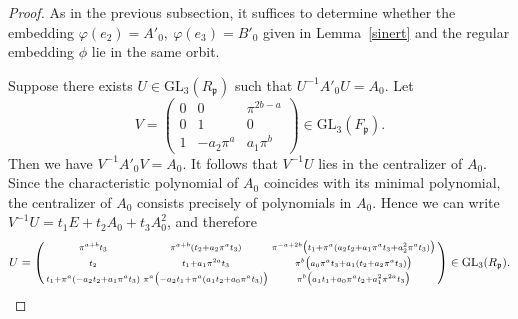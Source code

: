 \documentclass[12pt]{article}
\theoremstyle{plain}
\theoremstyle{definition}
\theoremstyle{remark}
\begin{document}
\begin{proof}
As in the previous subsection, it suffices to determine whether the embedding $\varphi(e_2)=A'_0,\ \varphi(e_3)=B'_0$ given in Lemma~\ref{sinert} and the regular embedding $\phi$ lie in the same orbit.

Suppose there exists $U\in \mathrm{GL}_3(R_\mathfrak{p})$ such that $U^{-1}A'_0 U = A_0$. Let 
$$V=\begin{pmatrix}
0 & 0 & \pi^{2b-a} \\
0 & 1 & 0 \\
1 & -a_2\pi^a & a_1\pi^b
\end{pmatrix}\in \mathrm{GL}_3(F_\mathfrak{p}).$$
Then we have $V^{-1}A'_0 V = A_0$. It follows that $V^{-1}U$ lies in the centralizer of $A_0$. Since the characteristic polynomial of $A_0$ coincides with its minimal polynomial, the centralizer of $A_0$ consists precisely of polynomials in $A_0$. Hence we can write $V^{-1}U = t_1E + t_2A_0 + t_3A_0^2$, and therefore
$$U=\begin{psmallmatrix}
\pi^{a+b} t_3 & \pi^{a+b}(t_2 + a_2 \pi^{a} t_3) & \pi^{-a+2b}\bigl(t_1 + \pi^{a}(a_2 t_2 + a_1 \pi^{a} t_3 + a_2^2 \pi^{a} t_3)\bigr) \\
t_2 & t_1 + a_1 \pi^{2a} t_3 & \pi^{b}\bigl(a_0 \pi^{a} t_3 + a_1 (t_2 + a_2 \pi^{a} t_3)\bigr) \\
t_1 + \pi^{a}(-a_2 t_2 + a_1 \pi^{a} t_3) & \pi^{a}\bigl(-a_2 t_1 + \pi^{a}(a_1 t_2 + a_0 \pi^{a} t_3)\bigr) & \pi^{b}\bigl(a_1 t_1 + a_0 \pi^{a} t_2 + a_1^2 \pi^{2a} t_3\bigr)
\end{psmallmatrix}\in \mathrm{GL}_3(R_\mathfrak{p}).$$


\end{proof}
\end{document}
